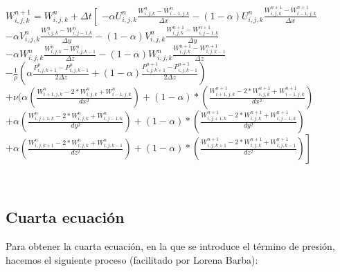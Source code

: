 \documentclass[a4paper]{article}
\begin{document}
\begin{enumerate}
$ W^{n+1}_{i,j,k} =  W^{n}_{i,j,k} +  \Delta t \left[ \right.$
$- \alpha {U}^{n}_{i,j,k} \frac{ {W}^{n}_{i,j,k} - W^{n}_{i-1,j,k}}{\Delta x} - (1 - \alpha) {U}^{n}_{i,j,k} \frac{ {W}^{n+1}_{i,j,k} - W^{n+1}_{i-1,j,k}}{ \Delta x}$ 
\\
$- \alpha {V}^{n}_{i,j,k} \frac{ {W}^{n}_{i,j,k} - W^{n}_{i,j-1,k}}{ \Delta y} - (1 - \alpha) {V}^{n}_{i,j,k} \frac{ {W}^{n+1}_{i,j,k} - W^{n+1}_{i,j-1,k}}{ \Delta y}$
\\
$- \alpha {W}^{n}_{i,j,k} \frac{ {W}^{n}_{i,j,k} - W^{n}_{i,j,k-1}}{ \Delta z} - (1 - \alpha) {W}^{n}_{i,j,k} \frac{ {W}^{n+1}_{i,j,k} - W^{n+1}_{i,j,k-1}}{ \Delta z}$
\\
$- \frac{1}{\rho} ( \alpha \frac{P^{n}_{i,j,k+1} - P^{n}_{i,j,k-1} }{ 2 \Delta z } + (1 - \alpha) \frac{P^{n+1}_{i,j,k+1} - P^{n+1}_{i,j,k-1} }{ 2 \Delta z })  $
\\
$+ \nu (\alpha (\frac{ W^{n}_{i+1,j,k} - 2*W^{n}_{i,j,k} + W^{n}_{i-1,j,k}}{dx^2}) + (1-\alpha)*(\frac{ W^{n+1}_{i+1,j,k} - 2*W^{n+1}_{i,j,k} + W^{n+1}_{i-1,j,k}}{dx^2})$
\\
$+ \alpha (\frac{ W^{n}_{i,j+1,k} - 2*W^{n}_{i,j,k} + W^{n}_{i,j-1,k}}{dy^2}) + (1-\alpha)*(\frac{ W^{n+1}_{i,j+1,k} - 2*W^{n+1}_{i,j,k} + W^{n+1}_{i,j-1,k}}{dy^2})$
\\
$\left. + \alpha (\frac{ W^{n}_{i,j,k+1} - 2*W^{n}_{i,j,k} + W^{n}_{i,j,k-1}}{dz^2}) + (1-\alpha)*(\frac{ W^{n+1}_{i,j,k+1} - 2*W^{n+1}_{i,j,k} + W^{n+1}_{i,j,k-1}}{dz^2}) \right]$

~\\

\end{enumerate}


\subsection{Cuarta ecuación}

Para obtener la cuarta ecuación, en la que se introduce el término de presión, hacemos el siguiente proceso (facilitado por Lorena Barba):
\end{document}
